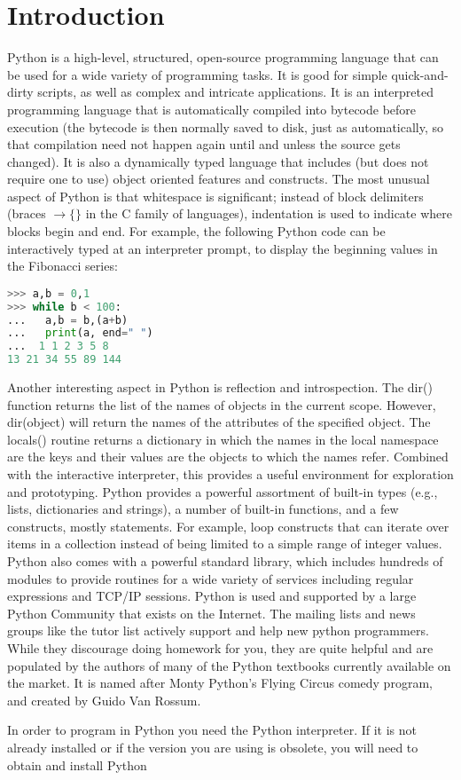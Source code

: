 \section{Introduction} 
Python is a high-level, structured, open-source
programming language that can be used for a wide variety of programming tasks.
It is good for simple quick-and-dirty scripts, as well as complex and intricate
applications.  It is an interpreted programming language that is automatically
compiled into bytecode before execution (the bytecode is then normally saved to
disk, just as automatically, so that compilation need not happen again until
and unless the source gets changed). It is also a dynamically typed language
that includes (but does not require one to use) object oriented features and
constructs.  The most unusual aspect of Python is that whitespace is
significant; instead of block delimiters (braces $\rightarrow \{\}$ in the C family of
languages), indentation is used to indicate where blocks begin and end.  For
example, the following Python code can be interactively typed at an interpreter
prompt, to display the beginning values in the Fibonacci series:
\lstset{basicstyle=\scriptsize, numbers=left, captionpos=b, tabsize=4}
\begin{lstlisting}[caption=Fibonacci,language={Python},
xleftmargin=15pt, label=lst:fibonacci]
>>> a,b = 0,1
>>> while b < 100:
...   a,b = b,(a+b)
...   print(a, end=" ")
...  1 1 2 3 5 8
13 21 34 55 89 144
\end{lstlisting}
Another interesting aspect in Python is reflection and
introspection. The dir() function returns the list of the names of objects in
the current scope. However, dir(object) will return the names of the attributes
of the specified object. The locals() routine returns a dictionary in which the
names in the local namespace are the keys and their values are the objects to
which the names refer. Combined with the interactive interpreter, this provides
a useful environment for exploration and prototyping.  Python provides a
powerful assortment of built-in types (e.g., lists, dictionaries and strings),
a number of built-in functions, and a few constructs, mostly statements. For
example, loop constructs that can iterate over items in a collection instead of
being limited to a simple range of integer values. Python also comes with a
powerful standard library, which includes hundreds of modules to provide
routines for a wide variety of services including regular expressions and
TCP/IP sessions.  Python is used and supported by a large Python Community that
exists on the Internet. The mailing lists and news groups like the tutor list
actively support and help new python programmers. While they discourage doing
homework for you, they are quite helpful and are populated by the authors of
many of the Python textbooks currently available on the market. It is named
after Monty Python's Flying Circus comedy program, and created by Guido Van
Rossum.

In order to program in Python you need the Python interpreter. If it is not
already installed or if the version you are using is obsolete, you will need to
obtain and install Python
